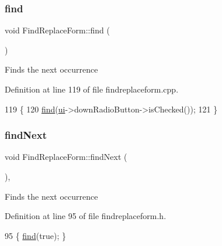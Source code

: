\mbox{\label{class_find_replace_form_ad2f83207e2b70f30680049286033915b}} 
\subsubsection{\texorpdfstring{find}{find}\hspace{0.1cm}{\footnotesize\ttfamily [2/2]}}
{\footnotesize\ttfamily void Find\+Replace\+Form\+::find (\begin{DoxyParamCaption}{ }\end{DoxyParamCaption})\hspace{0.3cm}{\ttfamily [slot]}}

Finds the next occurrence 

Definition at line 119 of file findreplaceform.\+cpp.


\begin{DoxyCode}
119                            \{
120     \hyperlink{class_find_replace_form_ad2f83207e2b70f30680049286033915b}{find}(\hyperlink{class_find_replace_form_a9bf9e9096feff863dcd6c2a989e07d2c}{ui}->downRadioButton->isChecked());
121 \}
\end{DoxyCode}
\mbox{\label{class_find_replace_form_a4aa85cfca1753dd04c1a118ac17257d9}} 
\subsubsection{\texorpdfstring{find\+Next}{findNext}}
{\footnotesize\ttfamily void Find\+Replace\+Form\+::find\+Next (\begin{DoxyParamCaption}{ }\end{DoxyParamCaption})\hspace{0.3cm}{\ttfamily [inline]}, {\ttfamily [slot]}}

Finds the next occurrence 

Definition at line 95 of file findreplaceform.\+h.


\begin{DoxyCode}
95 \{ \hyperlink{class_find_replace_form_ad2f83207e2b70f30680049286033915b}{find}(\textcolor{keyword}{true}); \}
\end{DoxyCode}
\mbox{\label{class_find_replace_form_a98ff3bc6e591f268bb44ce02c5e70663}} 

